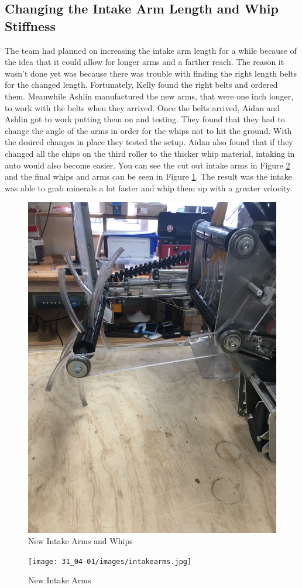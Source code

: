 \documentclass{article}
\begin{document}
\subsection{Changing the Intake Arm Length and Whip Stiffness}
The team had planned on increasing the intake arm length for a while because of the idea that it could allow for longer arms and a farther reach. The reason it wasn't done yet was because there was trouble with finding the right length belts for the changed length. Fortunately, Kelly found the right belts and ordered them. Meanwhile Ashlin manufactured the new arms, that were one inch longer, to work with the belts when they arrived. Once the belts arrived, Aidan and Ashlin got to work putting them on and testing. They found that they had to change the angle of the arms in order for the whips not to hit the ground. With the desired changes in place they tested the setup. Aidan also found that if they changed all the chips on the third roller to the thicker whip material, intaking in auto would also become easier. You can see the cut out intake arms in Figure \ref{fig:intakearms} and the final whips and arms can be seen in Figure \ref{fig:arms}. The result was the intake was able to grab minerals a lot faster and whip them up with a greater velocity.

\begin{figure}
    \centering
    \includegraphics[width= 0.5 \textwidth]{31_04-01/images/IMG_1934.JPG}
    \caption{New Intake Arms and Whips}
    \label{fig:arms}
\end{figure}

\begin{figure}
    \centering
    \texttt{[image: 31\_04-01/images/intakearms.jpg]}
    \caption{New Intake Arms}
    \label{fig:intakearms}
\end{figure}
\end{document}

